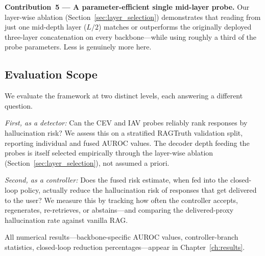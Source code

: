 \noindent\textbf{Contribution~5 — A parameter-efficient single mid-layer probe.} Our layer-wise ablation (Section~\ref{sec:layer_selection}) demonstrates that reading from just one mid-depth layer ($L/2$) matches or outperforms the originally deployed three-layer concatenation on every backbone—while using roughly a third of the probe parameters. Less is genuinely more here.

\subsection{Evaluation Scope}
\label{subsec:evaluation_scope}

We evaluate the framework at two distinct levels, each answering a different question.

\emph{First, as a detector:} Can the CEV and IAV probes reliably rank responses by hallucination risk? We assess this on a stratified RAGTruth validation split, reporting individual and fused AUROC values. The decoder depth feeding the probes is itself selected empirically through the layer-wise ablation (Section~\ref{sec:layer_selection}), not assumed a priori.

\emph{Second, as a controller:} Does the fused risk estimate, when fed into the closed-loop policy, actually reduce the hallucination risk of responses that get delivered to the user? We measure this by tracking how often the controller accepts, regenerates, re-retrieves, or abstains—and comparing the delivered-proxy hallucination rate against vanilla RAG.

All numerical results—backbone-specific AUROC values, controller-branch statistics, closed-loop reduction percentages—appear in Chapter~\ref{ch:results}.
